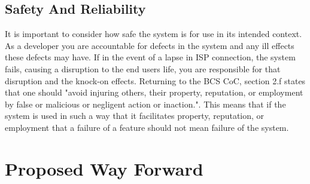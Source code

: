 \documentclass[12pt]{article}
\begin{document}
\subsection{Safety And Reliability}
It is important to consider how safe the system is for use in its intended context. 
As a developer you are accountable for defects in the system and any ill effects these defects may have. 
If in the event of a lapse in ISP connection, the system fails, causing a disruption to the end users life, you are responsible for that disruption and the knock-on effects. 
Returning to the BCS CoC, section 2.f states that one should "avoid injuring others, their property, reputation, or employment by false or malicious or negligent action or inaction.".\cite{bcs} 
This means that if the system is used in such a way that it facilitates property, reputation, or employment that a failure of a feature should not mean failure of the system. 



\section{Proposed Way Forward}
\end{document}
